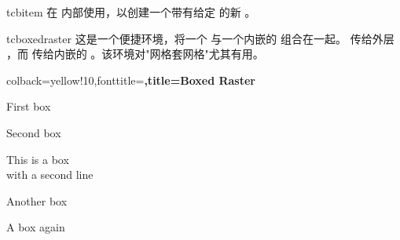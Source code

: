\begin{docCommand}[doc new=2014-11-10]{tcbitem}{}
  在  内部使用，以创建一个带有给定
   的新 。
\end{docCommand}


\clearpage
\begin{docEnvironment}[doc new=2016-02-19]{tcboxedraster}{}
  这是一个便捷环境，将一个  与一个内嵌的
   组合在一起。 传给外层
  ，而  传给内嵌的
  。该环境对"网格套网格"尤其有用。

\begin{dispExample}
\begin{tcboxedraster}[raster columns=3, raster equal height,
  size=small,colframe=red!50!black,colback=red!10!white,colbacktitle=red!50!white,
  title={Box \# \thetcbrasternum}]
  {colback=yellow!10,fonttitle=\bfseries,title=Boxed Raster}
  \begin{tcolorbox}First box\end{tcolorbox}
  \begin{tcolorbox}Second box\end{tcolorbox}
  \begin{tcolorbox}This is a box\\with a second line\end{tcolorbox}
  \begin{tcolorbox}Another box\end{tcolorbox}
  \begin{tcolorbox}A box again\end{tcolorbox}
\end{tcboxedraster}
\end{dispExample}


\end{docEnvironment}
